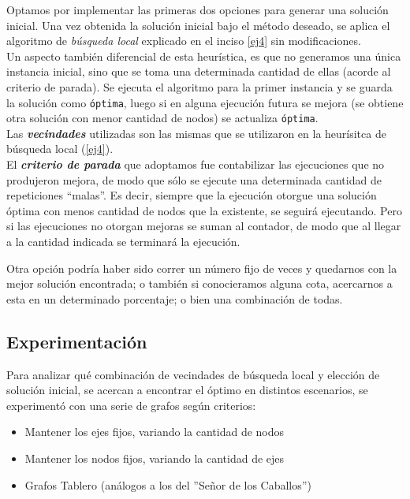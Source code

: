 Optamos por implementar las primeras dos opciones para generar una solución inicial. Una vez obtenida la solución inicial bajo el método deseado, se aplica el algoritmo de \emph{b\'usqueda local} explicado en el inciso \ref{ej4} sin modificaciones.\\

Un aspecto tambi\'en diferencial de esta heur\'istica, es que no generamos una \'unica instancia inicial, sino que se toma una determinada cantidad de ellas (acorde al criterio de parada). Se ejecuta el algoritmo para la primer instancia y se guarda la solución como \texttt{\'optima}, luego si en alguna ejecución futura se mejora (se obtiene otra solución con menor cantidad de nodos) se actualiza \texttt{\'optima}.\\

Las \emph{\textbf{vecindades}} utilizadas son las mismas que se utilizaron en la heur\'isitca de b\'usqueda local (\ref{ej4}).\\

El \emph{\textbf{criterio de parada}} que adoptamos fue contabilizar las ejecuciones que no produjeron mejora, de modo que sólo se ejecute una determinada cantidad de repeticiones ``malas''. Es decir, siempre que la ejecución otorgue una solución óptima con menos cantidad de nodos que la existente, se seguirá ejecutando. Pero si las ejecuciones no otorgan mejoras se suman al contador, de modo que al llegar a la cantidad indicada se terminará la ejecución.

Otra opci\'on podr\'ia haber sido correr un n\'umero fijo de veces y quedarnos con la mejor soluci\'on encontrada; o tambi\'en si conocieramos alguna cota, acercarnos a esta en un determinado porcentaje; o bien una combinaci\'on de todas.


\newpage
\subsection{Experimentaci\'on}

Para analizar qu\'e combinaci\'on de vecindades de b\'usqueda local y elecci\'on de soluci\'on inicial, se acercan a encontrar el \'optimo en distintos escenarios, se experiment\'o con una serie de grafos seg\'un criterios:
\begin{itemize}
	\item Mantener los ejes fijos, variando la cantidad de nodos
	\item Mantener los nodos fijos, variando la cantidad de ejes
	\item Grafos Tablero (an\'alogos a los del ''Se\~nor de los Caballos'')
\end{itemize}

